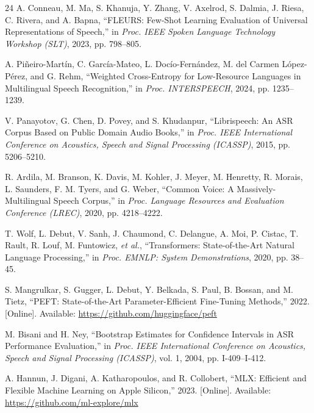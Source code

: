 \documentclass[conference]{IEEEtran}
\begin{document}
\begin{thebibliography}{24}
A. Conneau, M. Ma, S. Khanuja, Y. Zhang, V. Axelrod, S. Dalmia,
J. Riesa, C. Rivera, and A. Bapna, ``FLEURS: Few-Shot Learning
Evaluation of Universal Representations of Speech,'' in \emph{Proc. IEEE
Spoken Language Technology Workshop (SLT)}, 2023, pp. 798--805.

A. Pi\~{n}eiro-Mart\'{i}n, C. Garc\'{i}a-Mateo, L. Doc\'{i}o-Fern\'{a}ndez,
M. del Carmen L\'{o}pez-P\'{e}rez, and G. Rehm, ``Weighted
Cross-Entropy for Low-Resource Languages in Multilingual Speech
Recognition,'' in \emph{Proc. INTERSPEECH}, 2024, pp. 1235--1239.

V. Panayotov, G. Chen, D. Povey, and S. Khudanpur, ``Librispeech: An
ASR Corpus Based on Public Domain Audio Books,'' in \emph{Proc. IEEE
International Conference on Acoustics, Speech and Signal Processing
(ICASSP)}, 2015, pp. 5206--5210.

R. Ardila, M. Branson, K. Davis, M. Kohler, J. Meyer, M. Henretty,
R. Morais, L. Saunders, F. M. Tyers, and G. Weber, ``Common Voice: A
Massively-Multilingual Speech Corpus,'' in \emph{Proc. Language
Resources and Evaluation Conference (LREC)}, 2020, pp. 4218--4222.

T. Wolf, L. Debut, V. Sanh, J. Chaumond, C. Delangue, A. Moi,
P. Cistac, T. Rault, R. Louf, M. Funtowicz, \emph{et al.},
``Transformers: State-of-the-Art Natural Language Processing,'' in
\emph{Proc. EMNLP: System Demonstrations}, 2020, pp. 38--45.

S. Mangrulkar, S. Gugger, L. Debut, Y. Belkada, S. Paul, B. Bossan, and
M. Tietz, ``PEFT: State-of-the-Art Parameter-Efficient Fine-Tuning
Methods,'' 2022. [Online]. Available: \url{https://github.com/huggingface/peft}

M. Bisani and H. Ney, ``Bootstrap Estimates for Confidence Intervals in
ASR Performance Evaluation,'' in \emph{Proc. IEEE International
Conference on Acoustics, Speech and Signal Processing (ICASSP)}, vol. 1,
2004, pp. I-409--I-412.

A. Hannun, J. Digani, A. Katharopoulos, and R. Collobert, ``MLX:
Efficient and Flexible Machine Learning on Apple Silicon,'' 2023.
[Online]. Available: \url{https://github.com/ml-explore/mlx}

\end{thebibliography}
\end{document}
